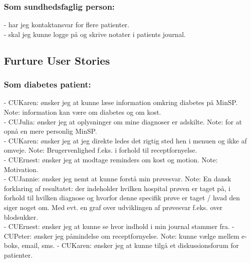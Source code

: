 \subsubsection*{Som sundhedsfaglig person:}
- har jeg kontaktansvar for flere patienter.\\
- skal jeg kunne logge på og skrive notater i patients journal.\\
\newline
\subsection{Furture User Stories}
\subsubsection*{Som diabetes patient:}
- CUKaren: ønsker jeg at kunne læse information omkring diabetes på MinSP. Note: information kan være om diabetes og om kost.\\
- CUJulia: ønsker jeg at oplysninger om mine diagnoser er adskilte. Note: for at opnå en mere personlig MinSP.\\
- CUKaren: ønsker jeg at jeg direkte ledes det rigtig sted hen i menuen og ikke af omveje. Note: Brugervenlighed f.eks. i forhold til receptfornyelse.\\ 
- CUErnest: ønsker jeg at modtage reminders om kost og motion. Note: Motivation. \\
- CUJannie: ønsker jeg nemt at kunne forstå min prøvesvar. Note: En dansk forklaring af resultatet: der indeholder hvilken hospital prøven er taget på, i forhold til hvilken diagnose og hvorfor denne specifik prøve er taget / hvad den siger noget om. Med evt. en graf over udviklingen af prøvesvar f.eks. over blodsukker.\\
- CUErnest: ønsker jeg at kunne se hvor indhold i min journal stammer fra.
- CUPeter: ønsker jeg påmindelse om receptfornyelse. Note: kunne vælge mellem e-boks, email, sms.
- CUKaren: ønsker jeg at kunne tilgå et diskussionsforum for patienter.\\
%
